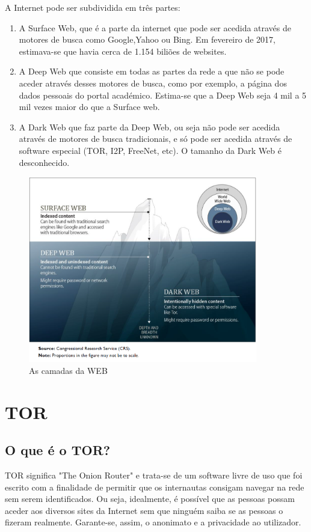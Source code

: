 \documentclass{llncs}
\begin{document}
\par A Internet pode ser subdividida em três partes:
\begin{enumerate}
\item A Surface Web, que é a parte da internet que pode ser acedida através de motores de busca como Google,Yahoo ou Bing. Em fevereiro de 2017, estimava-se que havia cerca de 1.154 biliões de websites.\cite {Kristin}
\item A Deep Web que consiste em todas as partes da rede a que não se pode aceder através desses motores de busca, como por exemplo, a página dos dados pessoais do portal académico. Estima-se que a Deep Web seja 4 mil a 5 mil vezes maior do que a Surface web.\cite {Kristin}
\item A Dark Web que faz parte da Deep Web, ou seja não pode ser acedida através de motores de busca tradicionais, e só pode ser acedida através de software especial (TOR, I2P, FreeNet, etc). O tamanho da Dark Web é desconhecido.\cite {Kristin}
\end{enumerate}

\begin{figure}
\begin{center}
\includegraphics[width=10cm]{Deep.jpg}
\caption{\label{fig:1}As camadas da WEB}
\end{center}
\end{figure}

\pagebreak
\section{TOR}

\subsection{O que é o TOR?}
\hspace{3mm} TOR significa "The Onion Router" e trata-se de um software livre de uso que foi escrito com a finalidade de permitir que os internautas consigam navegar na rede sem serem identificados. Ou seja, idealmente, é possível que as pessoas possam aceder aos diversos sites da Internet sem que ninguém saiba se as pessoas o fizeram realmente. Garante-se, assim, o anonimato e a privacidade ao utilizador.
\end{document}
